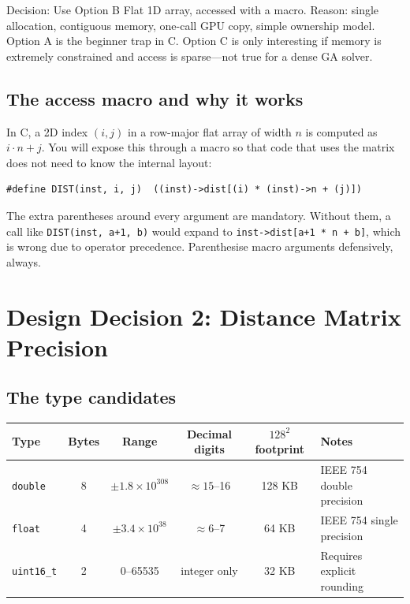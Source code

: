 \documentclass[11pt]{article}
\begin{document}
\begin{goodbox}{Decision: Use Option B}
Flat 1D array, accessed with a macro. Reason: single allocation, contiguous memory, one-call GPU copy, simple ownership model. Option A is the beginner trap in C. Option C is only interesting if memory is extremely constrained and access is sparse---not true for a dense GA solver.
\end{goodbox}

\subsection{The access macro and why it works}

In C, a 2D index $(i, j)$ in a row-major flat array of width $n$ is computed as $i \cdot n + j$. You will expose this through a macro so that code that uses the matrix does not need to know the internal layout:

\begin{lstlisting}[style=cstyle]
#define DIST(inst, i, j)  ((inst)->dist[(i) * (inst)->n + (j)])
\end{lstlisting}

The extra parentheses around every argument are mandatory. Without them, a call like \texttt{DIST(inst, a+1, b)} would expand to \texttt{inst->dist[a+1 * n + b]}, which is wrong due to operator precedence. Parenthesise macro arguments defensively, always.

\newpage

\section{Design Decision 2: Distance Matrix Precision}

\subsection{The type candidates}

\begin{center}
\renewcommand{\arraystretch}{1.5}
\begin{tabular}{lccccl}
\toprule
Type & Bytes & Range & Decimal digits & $128^2$ footprint & Notes \\
\midrule
\texttt{double} & 8 & $\pm 1.8 \times 10^{308}$ & $\approx 15$--16 & 128 KB & IEEE 754 double precision \\
\texttt{float}  & 4 & $\pm 3.4 \times 10^{38}$  & $\approx 6$--7  &  64 KB & IEEE 754 single precision \\
\texttt{uint16\_t} & 2 & 0--65535 & integer only & 32 KB & Requires explicit rounding \\
\bottomrule
\end{tabular}
\end{center}
\end{document}
